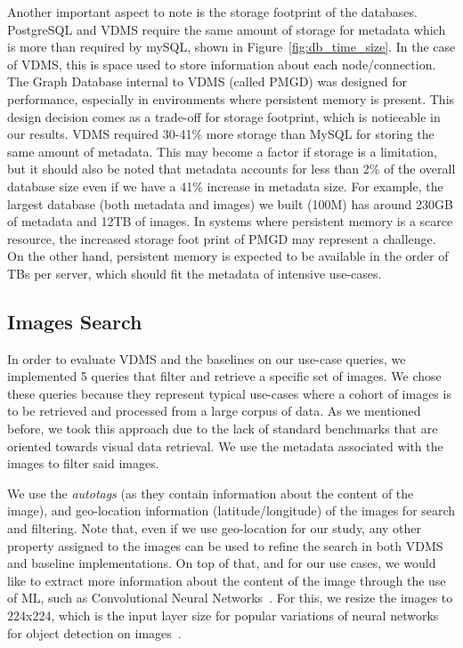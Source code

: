 Another important aspect to note is the storage footprint of the databases.
PostgreSQL and VDMS require the same amount of storage for metadata which
is more than required by mySQL, shown in Figure~\ref{fig:db_time_size}.
In the case of VDMS, this is space used to store information about
each node/connection.
The Graph Database internal to VDMS (called PMGD) was designed for performance,
especially in environments where persistent memory is present.
This design decision comes as a trade-off for storage footprint, which is
noticeable in our results.
VDMS required 30-41\% more storage than MySQL for storing the same amount
of metadata.
This may become a factor if storage is a limitation, but it should also be noted
that metadata accounts for less than 2\% of the overall database size
even if we have a 41\% increase in metadata size.
For example, the largest database (both metadata and images) we built
(100M) has around 230GB of metadata and 12TB of images.
In systems where persistent memory is a scarce resource,
the increased storage foot print of PMGD may represent a challenge.
On the other hand, persistent memory is expected to be available
in the order of TBs per server, which should fit the
metadata of intensive use-cases\cite{IntelXPoint15}.


\subsection{Images Search}
\label{images}

In order to evaluate VDMS and the baselines on our use-case queries,
we implemented 5 queries that filter and retrieve a specific set of images.
We chose these queries because they represent typical use-cases where a
cohort of images is to be retrieved and processed from a large corpus of data.
As we mentioned before, we took this approach due to the lack of standard
benchmarks that are oriented towards visual data retrieval.
We use the metadata associated with the images to filter said images.

We use the \textit{autotags} (as they contain information about the content
of the image), and geo-location information (latitude/longitude)
of the images for search and filtering.
Note that, even if we use geo-location for our study, any other property
assigned to the images can be used to refine the search
in both VDMS and baseline implementations.
On top of that, and for our use cases, we would like to extract more information
about the content of the image through the use of ML,
such as Convolutional Neural Networks~\cite{cnn}.
For this, we resize the images to 224x224, which is the input layer size for
popular variations of neural networks for object detection on images~\cite{resnet}.

